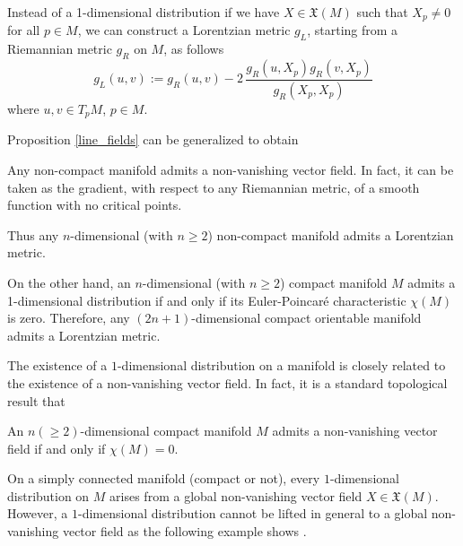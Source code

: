 \begin{remark}
    Instead of a 1-dimensional distribution if we have $X \in \mathfrak{X}(M)$ such that $X_p \neq 0$ for all $p \in M$, we can construct a Lorentzian metric $g_L$, starting from a Riemannian metric $g_R$ on $M$, as follows
    \[
        g_{L}(u,v):=g_{R}(u,v)-2\,\frac{g_R(u,X_p)g_R(v,X_p)}{g_R(X_p,X_p)}
    \]
    where $u,v \in T_{p}M$, $p\in M$.
\end{remark}

Proposition \ref{line_fields} can be generalized to obtain \cite{greub72}

Any non-compact manifold admits a non-vanishing vector field. In fact, it can be taken as the gradient, with respect to any Riemannian metric, of a smooth function with no critical points.

Thus any $n$-dimensional (with $n \geq 2$) non-compact manifold admits a Lorentzian metric.

On the other hand, an $n$-dimensional (with $n \geq 2$) compact manifold $M$ admits a 1-dimensional distribution if and only if its Euler-Poincaré characteristic $\chi (M)$ is zero. Therefore, any $(2n+1)$-dimensional compact orientable manifold admits a Lorentzian metric.

The existence of a $1$-dimensional distribution on a manifold is closely related to the existence of a non-vanishing vector field. In fact, it is a standard topological result that

\begin{proposition}
    An $n(\geq 2)$-dimensional compact manifold $M$ admits a non-vanishing vector field if and only if $\chi(M)=0$.
\end{proposition}

On a simply connected manifold (compact or not), every $1$-dimensional distribution on $M$ arises from a global non-vanishing vector field $X\in \mathfrak{X}(M)$. However, a $1$-dimensional distribution cannot be lifted in general to a global non-vanishing vector field as the following example shows \cite{greub72}.

